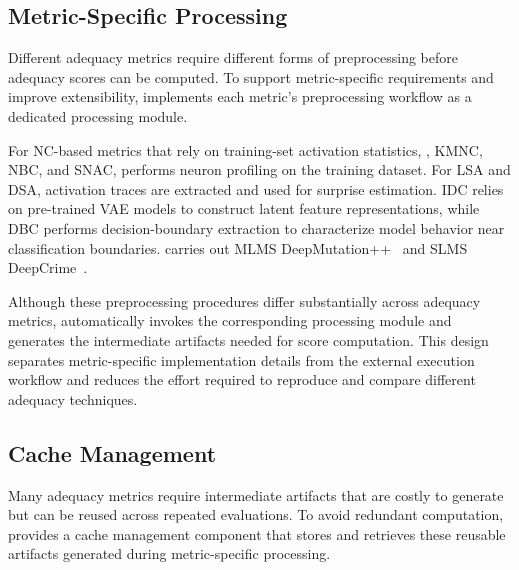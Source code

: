 \subsection{Metric-Specific Processing}
Different adequacy metrics require different forms of preprocessing before adequacy scores can be computed.
To support metric-specific requirements and improve extensibility, \tool implements each metric's preprocessing workflow as a dedicated processing module.

For NC-based metrics that rely on training-set activation statistics, \ie, KMNC, NBC, and SNAC, \tool performs neuron profiling on the training dataset.
For LSA and DSA, activation traces are extracted and used for surprise estimation.
IDC relies on pre-trained VAE models to construct latent feature representations, while DBC performs decision-boundary extraction to characterize model behavior near classification boundaries.
\tool carries out MLMS \ala DeepMutation++~\cite{bib:hu2019deepmutation++} and SLMS \ala DeepCrime~\cite{bib:humbatova2021deepcrime}.

Although these preprocessing procedures differ substantially across adequacy metrics, \tool automatically invokes the corresponding processing module and generates the intermediate artifacts needed for score computation.
This design separates metric-specific implementation details from the external execution workflow and reduces the effort required to reproduce and compare different adequacy techniques.

\subsection{Cache Management}
Many adequacy metrics require intermediate artifacts that are costly to generate but can be reused across repeated evaluations.
To avoid redundant computation, \tool provides a cache management component that stores and retrieves these reusable artifacts generated during metric-specific processing.

